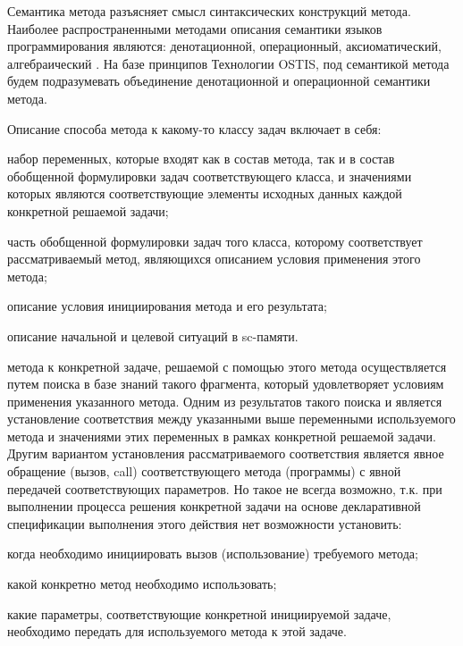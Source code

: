 Семантика метода разъясняет смысл синтаксических конструкций метода. Наиболее распространенными методами описания семантики языков программирования являются: денотационной, операционный, аксиоматический, алгебраический \cite{Orlov2013}. На базе принципов Технологии OSTIS, под семантикой метода будем подразумевать объединение денотационной и операционной семантики метода.

Описание способа  метода к какому-то классу задач включает в себя:
\begin{textitemize}
    \item набор переменных, которые входят как в состав метода, так и в состав обобщенной формулировки задач соответствующего класса, и значениями которых являются соответствующие элементы исходных данных каждой конкретной решаемой задачи;
    \item часть обобщенной формулировки задач того класса, которому соответствует рассматриваемый метод, являющихся описанием условия применения этого метода;
    \item описание условия инициирования метода и его результата;
    \item описание начальной и целевой ситуаций в sc-памяти.
\end{textitemize}

 метода к конкретной задаче, решаемой с помощью этого метода осуществляется путем поиска в базе знаний такого фрагмента, который удовлетворяет условиям применения указанного метода. Одним из результатов такого поиска и является установление соответствия между указанными выше переменными используемого метода и значениями этих переменных в рамках конкретной решаемой задачи. Другим вариантом установления рассматриваемого соответствия является явное обращение (вызов, call) соответствующего метода (программы) с явной передачей соответствующих параметров. Но такое не всегда возможно, т.к. при выполнении процесса решения конкретной задачи на основе декларативной спецификации выполнения этого действия нет возможности установить:
\begin{textitemize}
    \item когда необходимо инициировать вызов (использование) требуемого метода;
    \item какой конкретно метод необходимо использовать;
    \item какие параметры, соответствующие конкретной инициируемой задаче, необходимо передать для  используемого метода к этой задаче.
\end{textitemize}

